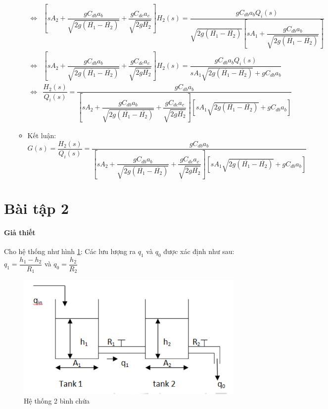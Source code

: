 \documentclass[12pt,a4paper]{article}
\begin{document}
\begin{enumerate}[\it a.]
\begin{itemize}
\begin{align}
                            \Longleftrightarrow & \left[{s A_2 + \dfrac{g C_{db}a_b}{ \sqrt{2g(\overline{H_1} - \overline{H_2})}} + \dfrac{g C_{dc}a_c}{\sqrt{2g\overline{H_2}}} }\right] H_2 (s) = \dfrac{g C_{db}a_b Q_i(s)}{\sqrt{2g(\overline{H_1} - \overline{H_2})} \left[{s A_1 + \dfrac{gC_{db}a_b}{\sqrt{2g(\overline{H_1} - \overline{H_2})}}}\right]} \\
                            \Longleftrightarrow & \left[{s A_2 + \dfrac{g C_{db}a_b}{ \sqrt{2g(\overline{H_1} - \overline{H_2})}} + \dfrac{g C_{dc}a_c}{\sqrt{2g\overline{H_2}}} }\right] H_2 (s) = \dfrac{g C_{db}a_b Q_i(s)}{s A_1 \sqrt{2g(\overline{H_1} - \overline{H_2})} + gC_{db}a_b} \\
                            \Longleftrightarrow & \dfrac{H_2(s)}{Q_i(s)} = \dfrac{g C_{db}a_b}{\left[{s A_2 + \dfrac{g C_{db}a_b}{ \sqrt{2g(\overline{H_1} - \overline{H_2})}} + \dfrac{g C_{dc}a_c}{\sqrt{2g\overline{H_2}}} }\right]  \left[{ s A_1 \sqrt{2g(\overline{H_1} - \overline{H_2})} + gC_{db}a_b }\right]}
                        \end{align}

                    \item Kết luận: $G(s) = \dfrac{H_2(s)}{Q_i(s)} = \dfrac{g C_{db}a_b}{\left[{s A_2 + \dfrac{g C_{db}a_b}{ \sqrt{2g(\overline{H_1} - \overline{H_2})}} + \dfrac{g C_{dc}a_c}
                    {\sqrt{2g\overline{H_2}}} }\right]  \left[{ s A_1 \sqrt{2g(\overline{H_1} - \overline{H_2})} + gC_{db}a_b }\right]}$
                \end{itemize}
        \end{enumerate}


\section{Bài tập 2}
    \paragraph{Giả thiết}
    Cho hệ thống như hình \ref{baitap2}:  Các lưu lượng ra $q_1$ và $q_0$ được xác định như sau: $q_1 = \dfrac{h_1 - h_2}{R_1}$ và $q_0 = \dfrac{h_2}{R_2}$
    \begin{figure}[htp]
        \begin{center}
            \includegraphics[scale=.5]{bai2}
        \end{center}
        \caption{Hệ thống 2 bình chứa} \label{baitap2}
    \end{figure}
\end{document}
